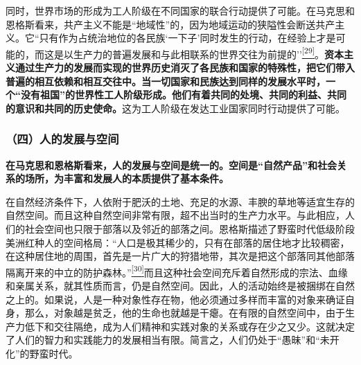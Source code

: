 \documentclass[UTF8, fontset = sourcesans, a4paper, oneside, zihao =
-4, scheme=chinese, no-math, space=true]{ctexbook}
\begin{document}
同时，世界市场的形成为工人阶级在不同国家的联合行动提供了可能。在马克思和恩格斯看来，共产主义不能是``地域性''的，因为地域运动的狭隘性会断送共产主义。它``只有作为占统治地位的各民族`一下子'同时发生的行动，在经验上才是可能的，而这是以生产力的普遍发展和与此相联系的世界交往为前提的''\protect\hypertarget{part0010_split_002.htmlux5cux23w29}{}{}\protect\hyperlink{part0010_split_002.htmlux5cux23m29}{\textsuperscript{{[}29{]}}}。\textbf{资本主义通过生产力的发展而实现的世界历史消灭了各民族和国家的特殊性，把它们带入普遍的相互依赖和相互交往中。当一切国家和民族达到同样的发展水平时，一个``没有祖国''的世界性工人阶级形成。他们有着共同的处境、共同的利益、共同的意识和共同的历史使命。}这为工人阶级在发达工业国家同时行动提供了可能。

\subsubsection{（四）人的发展与空间}\label{part0010_split_002.htmlux5cux23d038}

\textbf{在马克思和恩格斯看来，人的发展与空间是统一的。空间是``自然产品''和社会关系的场所，为丰富和发展人的本质提供了基本条件。}

在自然经济条件下，人依附于肥沃的土地、充足的水源、丰腴的草地等适宜生存的自然空间。而且这种自然空间非常有限，超不出当时的生产力水平。与此相应，人们的社会空间也只限于部落以及邻近的部落之间。恩格斯描述了野蛮时代低级阶段美洲红种人的空间格局：``人口是极其稀少的，只有在部落的居住地才比较稠密，在这种居住地的周围，首先是一片广大的狩猎地带，其次是把这个部落同其他部落隔离开来的中立的防护森林。''\protect\hypertarget{part0010_split_002.htmlux5cux23w30}{}{}\protect\hyperlink{part0010_split_002.htmlux5cux23m30}{\textsuperscript{{[}30{]}}}而且这种社会空间充斥着自然形成的宗法、血缘和亲属关系，就其性质而言，仍是自然空间。因此，人的活动始终是被捆绑在自然之上的。如果说，人是一种对象性存在物，他必须通过多样而丰富的对象来确证自身，那么，对象越是贫乏，他的生命也就越是干瘪。在有限的自然空间中，由于生产力低下和交往隔绝，成为人们精神和实践对象的关系或存在少之又少。这就决定了人们的智力和实践能力的发展相当有限。简言之，人们仍处于``愚昧''和``未开化''的野蛮时代。
\end{document}
